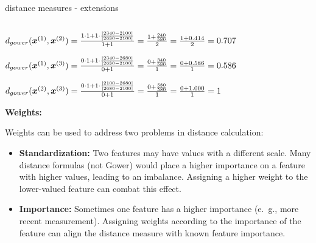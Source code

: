 \documentclass[11pt,compress,t,notes=noshow, xcolor=table]{beamer}
\newenvironment{knitrout}{}{} %
\begin{document}
\begin{vbframe}{distance measures - extensions}
\begin{columns}[T]
\begin{column}{0.4\textwidth}
\begin{knitrout}
\end{knitrout}
  \end{column}
  \begin{column}{0.5\textwidth}
    \vspace{0.6cm}
  \end{column}
\end{columns}

\vfill

$d_{gower}(\bm{x}^{(1)},\bm{x}^{(2)}) = \frac{ 1 \cdot 1 + 1 \cdot \frac{\left| 2340 - 2100 \right|}
{\left| 2680 - 2100 \right|}}{1 + 1} = \frac{1 + \frac{240}{580}}{2} = \frac{1 + 0.414}{2} = 0.707
$

\vfill

$d_{gower}(\bm{x}^{(1)},\bm{x}^{(3)}) = \frac{ 0 \cdot 1 + 1 \cdot \frac{\left| 2340 - 2680 \right|}
{\left| 2680 - 2100 \right|}}{0 + 1} = \frac{0 + \frac{340}{580}}{1} = \frac{0 + 0.586}{1} = 0.586
$

\vfill

$d_{gower}(\bm{x}^{(2)},\bm{x}^{(3)}) = \frac{0 \cdot 1 + 1 \cdot \frac{\left| 2100 - 2680 \right|}
{\left| 2680 - 2100 \right|}}{0 + 1} = \frac{0 + \frac{580}{580}}{1} = \frac{0 + 1.000}{1} = 1
$

\vfill

\framebreak

\textbf{Weights:}
\vfill

Weights can be used to address two problems in distance calculation:

\begin{itemize}
  \item \textbf{Standardization:} Two features may have values with a different scale. Many distance formulas (not Gower) would place a higher importance on a feature with higher values, leading to an imbalance. Assigning a higher weight to the lower-valued feature can combat this effect.
  \item \textbf{Importance:} Sometimes one feature has a higher importance (e.~g., more recent measurement). Assigning weights according to the importance of the feature can align the distance measure with known feature importance.
\end{itemize}


\end{vbframe}
\end{document}
